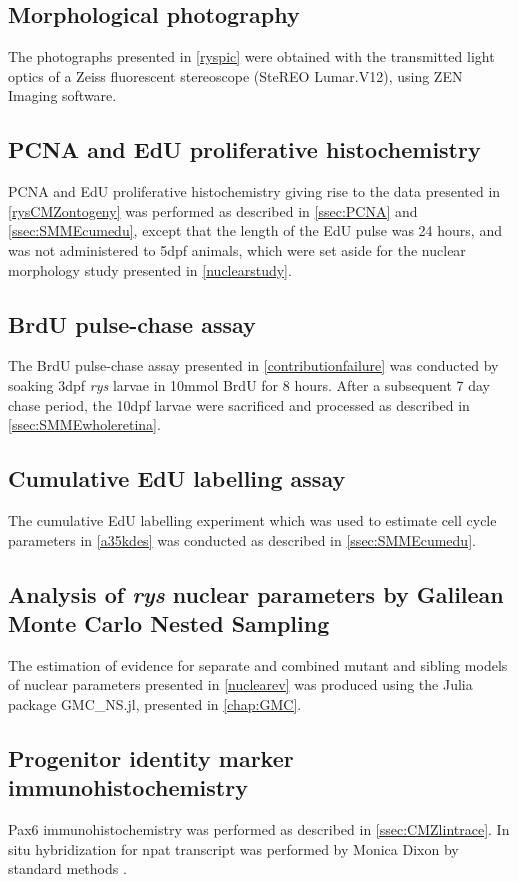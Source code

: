 \documentclass{ut-thesis}
\begin{document}
\begin{NoHyper}
\subsection{Morphological photography}
The photographs presented in \autoref{ryspic} were obtained with the transmitted light optics of a Zeiss fluorescent stereoscope (SteREO Lumar.V12), using ZEN Imaging software.

\subsection{PCNA and EdU proliferative histochemistry}
\label{ssec:rysPCNAEdU}
PCNA and EdU proliferative histochemistry giving rise to the data presented in \autoref{rysCMZontogeny} was performed as described in \autoref{ssec:PCNA} and \autoref{ssec:SMMEcumedu}, except that the length of the EdU pulse was 24 hours, and was not administered to 5dpf animals, which were set aside for the nuclear morphology study presented in \autoref{nuclearstudy}.

\subsection{BrdU pulse-chase assay}
\label{ssec:rysBrdUpulse}
The BrdU pulse-chase assay presented in \autoref{contributionfailure} was conducted by soaking 3dpf \textit{rys} larvae in 10\si{\milli\mole} BrdU for 8 hours. After a subsequent 7 day chase period, the 10dpf larvae were sacrificed and processed as described in \autoref{ssec:SMMEwholeretina}.

\subsection{Cumulative EdU labelling assay}
\label{ssec:RyscumEdU}
The cumulative EdU labelling experiment which was used to estimate cell cycle parameters in \autoref{a35kdes} was conducted as described in \autoref{ssec:SMMEcumedu}.

\subsection{Analysis of \textit{rys} nuclear parameters by Galilean Monte Carlo Nested Sampling}
\label{ssec:rysnucev}
The estimation of evidence for separate and combined mutant and sibling models of nuclear parameters presented in \autoref{nuclearev} was produced using the Julia package GMC\_NS.jl, presented in \autoref{chap:GMC}. 

\subsection{Progenitor identity marker immunohistochemistry}
\label{ssec:rysprogenIHC}
Pax6 immunohistochemistry was performed as described in \autoref{ssec:CMZlintrace}.  In situ hybridization for npat transcript was performed by Monica Dixon by standard methods \cite{Westerfield2000}.


\end{NoHyper}
\end{document}
